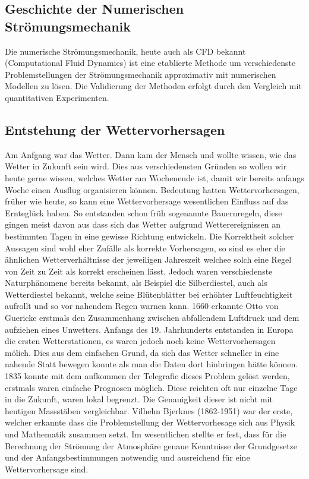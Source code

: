 \begin{refsection}
\section{Geschichte der Numerischen Strömungsmechanik
\label{section:klima:geschichte}}
Die numerische Strömungsmechanik, heute auch als CFD bekannt (Computational Fluid Dynamics) ist eine etablierte Methode um verschiedenste Problemstellungen der Strömungsmechanik approximativ mit numerischen Modellen zu lösen. Die Validierung der Methoden erfolgt durch den Vergleich mit quantitativen Experimenten.


\subsection{Entstehung der Wettervorhersagen
\label{subsection:klima:wetter}}
Am Anfgang war das Wetter. Dann kam der Mensch und wollte wissen, wie das Wetter in Zukunft sein wird. Dies aus verschiedensten Gründen so wollen wir heute gerne wissen, welches Wetter am Wochenende ist, damit wir bereits anfangs Woche einen Ausflug organisieren können. Bedeutung hatten Wettervorhersagen, früher wie heute, so kann eine Wettervorhersage wesentlichen Einfluss auf das Ernteglück haben. So entstanden schon früh sogenannte Bauernregeln, diese gingen meist davon aus dass sich das Wetter aufgrund Wetterereignissen an bestimmten Tagen in eine gewisse Richtung entwickeln. Die Korrektheit solcher Aussagen sind wohl eher Zufälle als korrekte Vorhersagen, so sind es eher die ähnlichen Wetterverhältnisse der jeweiligen Jahreszeit welchee solch eine Regel von Zeit zu Zeit als korrekt erscheinen lässt. Jedoch waren verschiedenste Naturphänomene bereits bekannt, als Beispiel die Silberdiestel, auch als Wetterdiestel bekannt, welche seine Blütenblätter bei erhöhter Luftfeuchtigkeit aufrollt und so vor nahendem Regen warnen kann.
1660 erkannte Otto von Guericke erstmals den Zusammenhang zwischen abfallendem Luftdruck und dem aufziehen eines Unwetters.
Anfangs des 19. Jahrhunderts entstanden in Europa die ersten Wetterstationen, es waren jedoch noch keine Wettervorhersagen mölich. Dies aus dem einfachen Grund, da sich das Wetter schneller in eine nahende Statt bewegen konnte als man die Daten dort hinbringen hätte können.
1835 konnte mit dem aufkommen der Telegrafie dieses Problem gelöst werden, erstmals waren einfache Prognosen möglich. Diese reichten oft nur einzelne Tage in die Zukunft, waren lokal begrenzt. Die Genauigkeit dieser ist nicht mit heutigen Massstäben vergleichbar.
Vilhelm Bjerknes (1862-1951) war der erste, welcher erkannte dass die Problemstellung der Wettervorhesage sich aus Physik und Mathematik zusammen setzt. Im wesentlichen stellte er fest, dass für die Berechnung der Strömung der Atmosphäre genaue Kenntnisse der Grundgesetze und der Anfangsbestimmungen notwendig und ausreichend für eine Wettervorhersage sind.



\end{refsection}
